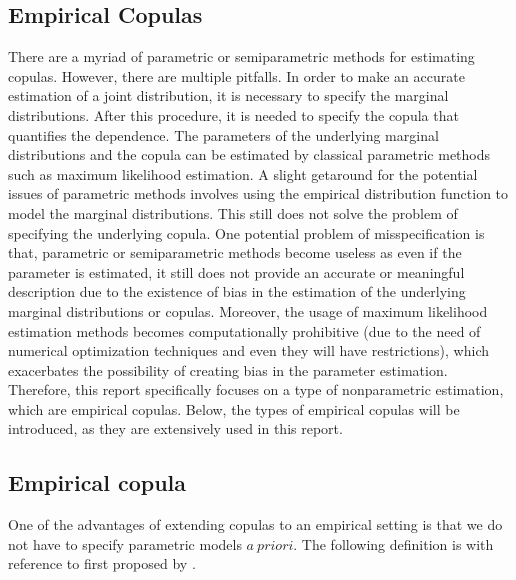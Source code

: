 \documentclass[12pt]{report}
\newcommand{\1}{\mathbf{1}}
\begin{document}
\begin{flushleft}
\newpage
\section{Empirical Copulas}
\vspace{0.5cm}
There are a myriad of parametric or semiparametric methods for estimating copulas. However, there are multiple pitfalls. In order to make an accurate estimation of a joint distribution, it is necessary to specify the marginal distributions. After this procedure, it is needed to specify the copula that quantifies the dependence. The parameters of the underlying marginal distributions and the copula can be estimated by classical parametric methods such as maximum likelihood estimation. A slight getaround for the potential issues of parametric methods involves using the empirical distribution function to model the marginal distributions. This still does not solve the problem of specifying the underlying copula. One potential problem of misspecification is that, parametric or semiparametric methods become useless as even if the parameter is estimated, it still does not provide an accurate or meaningful description due to the existence of bias in the estimation of the underlying marginal distributions or copulas. Moreover, the usage of maximum likelihood estimation methods becomes computationally prohibitive (due to the need of numerical optimization techniques and even they will have restrictions), which exacerbates the possibility of creating bias in the parameter estimation. \\
\vspace{0.5cm}
Therefore, this report specifically focuses on a type of nonparametric estimation, which are empirical copulas. Below, the types of empirical copulas will be introduced, as they are extensively used in this report.

\newpage
\subsection{Empirical copula}
\vspace{0.5cm}
One of the advantages of extending copulas to an empirical setting is that we do not have to specify parametric models $a \: priori$. The following definition is with reference to \cite{SegersEBC} first proposed by \cite{DeheuvelsEC}.


\end{flushleft}
\end{document}

